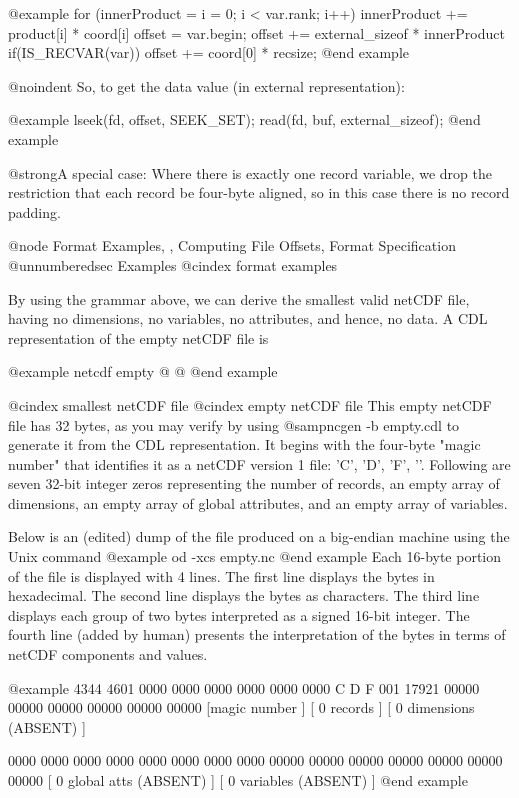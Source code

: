 {@example
for (innerProduct = i = 0; i < var.rank; i++)
        innerProduct += product[i] * coord[i]
offset = var.begin;
offset += external_sizeof * innerProduct
if(IS_RECVAR(var))
        offset += coord[0] * recsize;
@end example

@noindent
So, to get the data value (in external representation):

@example
lseek(fd, offset, SEEK_SET);
read(fd, buf, external_sizeof);
@end example

@strong{A special case}: Where there is exactly one record variable, we
drop the restriction that each record be four-byte aligned, so in this
case there is no record padding.

@node Format Examples,  , Computing File Offsets, Format Specification
@unnumberedsec Examples
@cindex format examples

By using the grammar above, we can derive the smallest valid netCDF
file, having no dimensions, no variables, no attributes, and hence, no
data.  A CDL representation of the empty netCDF file is

@example
netcdf empty @{ @}
@end example

@cindex smallest netCDF file
@cindex empty netCDF file
This empty netCDF file has 32 bytes, as you may verify by using
@samp{ncgen -b empty.cdl} to generate it from the CDL representation.
It begins with the four-byte "magic number" that identifies it as a
netCDF version 1 file: 'C', 'D', 'F', ''.  Following are seven 32-bit
integer zeros representing the number of records,
an empty array of dimensions, an empty array
of global attributes, and an empty array of variables.

Below is an (edited) dump of the file produced on a big-endian machine
using the Unix command
@example
od -xcs empty.nc
@end example
Each 16-byte portion of the file is displayed with 4 lines.
The first line displays the bytes in hexadecimal.
The second line displays the bytes as characters.
The third line displays each group of two bytes interpreted as a signed
16-bit integer.
The fourth line (added by human) presents the interpretation of the bytes in
terms of netCDF components and values.

@example
   4344    4601    0000    0000    0000    0000    0000    0000
  C   D   F 001  \0  \0  \0  \0  \0  \0  \0  \0  \0  \0  \0     17921   00000   00000   00000   00000   00000   00000
[magic number ] [  0 records  ] [  0 dimensions   (ABSENT)    ]

   0000    0000    0000    0000    0000    0000    0000    0000
 \0  \0  \0  \0  \0  \0  \0  \0  \0  \0  \0  \0  \0  \0  \0     00000   00000   00000   00000   00000   00000   00000
[  0 global atts  (ABSENT)    ] [  0 variables    (ABSENT)    ]
@end example

}
